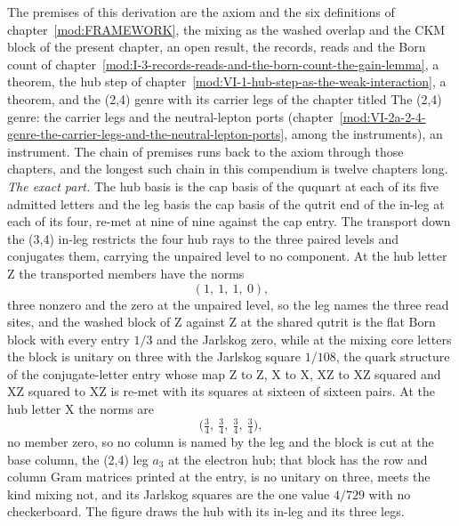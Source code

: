 \begin{chproof}
The premises of this derivation are the axiom and the six definitions of chapter~\ref{mod:FRAMEWORK}, the mixing as the washed overlap and the CKM block of the present chapter, an open result, the records, reads and the Born count of chapter~\ref{mod:I-3-records-reads-and-the-born-count-the-gain-lemma}, a theorem, the hub step of chapter~\ref{mod:VI-1-hub-step-as-the-weak-interaction}, a theorem, and the (2,4) genre with its carrier legs of the chapter titled The (2,4) genre: the carrier legs and the neutral-lepton ports (chapter~\ref{mod:VI-2a-2-4-genre-the-carrier-legs-and-the-neutral-lepton-ports}, among the instruments), an instrument. The chain of premises runs back to the axiom through those chapters, and the longest such chain in this compendium is twelve chapters long.
\textit{The exact part.} The hub basis is the cap basis of the ququart at each of its five admitted letters and the leg basis the cap basis of the qutrit end of the in-leg at each of its four, re-met at nine of nine against the cap entry. The transport down the (3,4) in-leg restricts the four hub rays to the three paired levels and conjugates them, carrying the unpaired level to no component. At the hub letter Z the transported members have the norms
\begin{equation} (1,\ 1,\ 1,\ 0), \end{equation}
three nonzero and the zero at the unpaired level, so the leg names the three read sites, and the washed block of Z against Z at the shared qutrit is the flat Born block with every entry $1/3$ and the Jarlskog zero, while at the mixing core letters the block is unitary on three with the Jarlskog square $1/108$, the quark structure of the conjugate-letter entry whose map Z to Z, X to X, XZ to XZ squared and XZ squared to XZ is re-met with its squares at sixteen of sixteen pairs. At the hub letter X the norms are
\begin{equation} \Big(\tfrac{3}{4},\ \tfrac{3}{4},\ \tfrac{3}{4},\ \tfrac{3}{4}\Big), \end{equation}
no member zero, so no column is named by the leg and the block is cut at the base column, the (2,4) leg $a_{3}$ at the electron hub; that block has the row and column Gram matrices printed at the entry, is no unitary on three, meets the kind mixing not, and its Jarlskog squares are the one value $4/729$ with no checkerboard. The figure draws the hub with its in-leg and its three legs.

\end{chproof}
